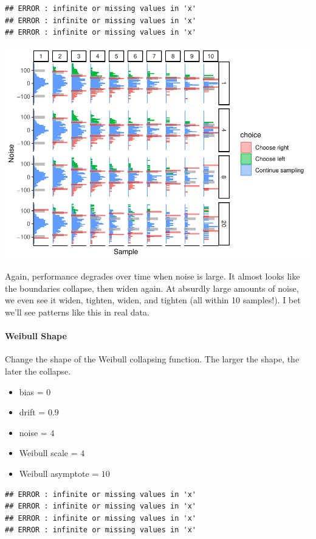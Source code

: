 \documentclass[
]{book}
\providecommand{\tightlist}{%
  \setlength{\itemsep}{0pt}\setlength{\parskip}{0pt}}
\begin{document}
\begin{verbatim}
## ERROR : infinite or missing values in 'x' 
## ERROR : infinite or missing values in 'x' 
## ERROR : infinite or missing values in 'x'
\end{verbatim}

\includegraphics{LateNightBayes_files/figure-latex/unnamed-chunk-12-1.pdf}

Again, performance degrades over time when noise is large. It almost looks like the boundaries collapse, then widen again. At absurdly large amounts of noise, we even see it widen, tighten, widen, and tighten (all within 10 samples!). I bet we'll see patterns like this in real data.

\hypertarget{weibull-shape}{%
\paragraph*{Weibull Shape}\label{weibull-shape}}

Change the shape of the Weibull collapsing function. The larger the shape, the later the collapse.

\begin{itemize}
\tightlist
\item
  bias = \(0\)
\item
  drift = \(0.9\)
\item
  noise = \(4\)
\item
  Weibull scale = \(4\)
\item
  Weibull asymptote = \(10\)
\end{itemize}

\begin{verbatim}
## ERROR : infinite or missing values in 'x' 
## ERROR : infinite or missing values in 'x' 
## ERROR : infinite or missing values in 'x' 
## ERROR : infinite or missing values in 'x'
\end{verbatim}
\end{document}
